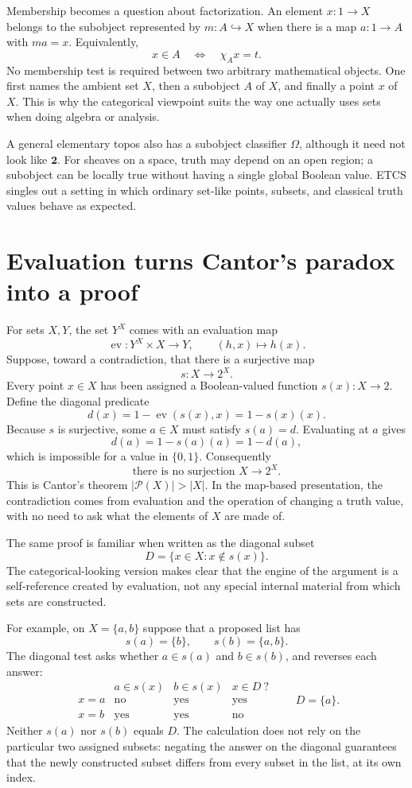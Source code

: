 Membership becomes a question about factorization. An element $x:1\to X$ belongs to the subobject represented by $m:A\hookrightarrow X$ when there is a map $a:1\to A$ with $ma=x$. Equivalently,
\[
 x\in A\quad\Longleftrightarrow\quad \chi_Ax=t.
\]
No membership test is required between two arbitrary mathematical objects. One first names the ambient set $X$, then a subobject $A$ of $X$, and finally a point $x$ of $X$. This is why the categorical viewpoint suits the way one actually uses sets when doing algebra or analysis.

A general elementary topos also has a subobject classifier $\Omega$, although it need not look like $\mathbf2$. For sheaves on a space, truth may depend on an open region; a subobject can be locally true without having a single global Boolean value. ETCS singles out a setting in which ordinary set-like points, subsets, and classical truth values behave as expected.

\section{Evaluation turns Cantor's paradox into a proof}

For sets \(X,Y\), the set \(Y^X\) comes with an evaluation map
\[
 \operatorname{ev}:Y^X\times X\to Y,\qquad
 (h,x)\longmapsto h(x).
\]
Suppose, toward a contradiction, that there is a surjective map
\[
 s:X\longrightarrow 2^X.
\]
Every point \(x\in X\) has been assigned a Boolean-valued function \(s(x):X\to2\). Define the diagonal predicate
\[
 d(x)=1-\operatorname{ev}(s(x),x)=1-s(x)(x).
\]
Because \(s\) is surjective, some \(a\in X\) must satisfy \(s(a)=d\). Evaluating at \(a\) gives
\[
 d(a)=1-s(a)(a)=1-d(a),
\]
which is impossible for a value in \(\{0,1\}\). Consequently
\[
 \boxed{\text{there is no surjection }X\to2^X.}
\]
This is Cantor's theorem \(|\mathcal P(X)|>|X|\). In the map-based presentation, the contradiction comes from evaluation and the operation of changing a truth value, with no need to ask what the elements of \(X\) are made of.

The same proof is familiar when written as the diagonal subset
\[
 D=\{x\in X:x\notin s(x)\}.
\]
The categorical-looking version makes clear that the engine of the argument is a self-reference created by evaluation, not any special internal material from which sets are constructed.

For example, on $X=\{a,b\}$ suppose that a proposed list has
\[
 s(a)=\{b\},\qquad s(b)=\{a,b\}.
\]
The diagonal test asks whether $a\in s(a)$ and $b\in s(b)$, and reverses each answer:
\[
\begin{array}{c|cc|c}
 &a\in s(x)&b\in s(x)&x\in D\ ?\\\hline
 x=a&\text{no}&\text{yes}&\text{yes}\\
 x=b&\text{yes}&\text{yes}&\text{no}
\end{array}
\qquad D=\{a\}.
\]
Neither $s(a)$ nor $s(b)$ equals $D$. The calculation does not rely on the particular two assigned subsets: negating the answer on the diagonal guarantees that the newly constructed subset differs from every subset in the list, at its own index.

